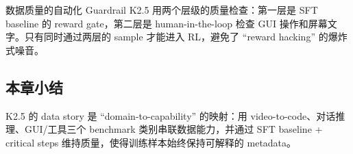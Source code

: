 \begin{importantbox}{数据质量的自动化 Guardrail}
K2.5 用两个层级的质量检查：第一层是 SFT baseline 的 reward gate，第二层是 human-in-the-loop 检查 GUI 操作和屏幕文字。只有同时通过两层的 sample 才能进入 RL，避免了 ``reward hacking'' 的爆炸式噪音。
\end{importantbox}

\subsection{本章小结}
K2.5 的 data story 是 ``domain-to-capability'' 的映射：用 video-to-code、对话推理、GUI/工具三个 benchmark 类别串联数据能力，并通过 SFT baseline + critical steps 维持质量，使得训练样本始终保持可解释的 metadata。
